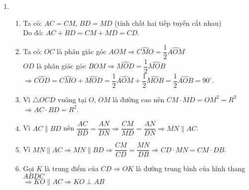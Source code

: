\begin{bt}
{\begin{center}
		\end{center}
		\begin{enumerate}[1.]
			\item 
			\begin{enumerate}
				\item  Ta có: $AC=CM$, $BD=MD$ (tính chất hai tiếp tuyến cắt nhau)\\ 
				Do đó: $AC+BD=CM+MD=CD$.
				\item Ta có: $OC$ là phân giác góc $AOM \Rightarrow \widehat{CMO}=\dfrac{1}{2}\widehat{AOM}$\\
				$OD$ là phân giác góc $BOM \Rightarrow \widehat{MOD}=\dfrac{1}{2}\widehat{MOB}$\\
				$\Rightarrow \widehat{COD}=\widehat{CMO}+\widehat{MOD}=\dfrac{1}{2}\widehat{AOM}+\dfrac{1}{2}\widehat{MOB}=\dfrac{1}{2}\widehat{AOB}=90^\circ$.
				\item Vì $\triangle OCD$ vuông tại $O$, $OM$ là đường cao nên $CM \cdot MD=OM^2=R^2$
				$\Rightarrow AC \cdot BD=R^2$.
				\item Vì $AC  \parallel BD$ nên $\dfrac{AC}{BD}=\dfrac{AN}{DN} \Rightarrow \dfrac{CM}{MD}=\dfrac{AN}{DN} \Rightarrow MN \parallel AC$.
				\item Vì $MN \parallel AC \Rightarrow MN \parallel BD \Rightarrow \dfrac{CM}{CD}=\dfrac{MN}{DB} \Rightarrow CD \cdot MN=CM \cdot DB$.
				\item Gọi $K$ là trung điểm của $CD \Rightarrow OK$ là đường trung bình của hình thang $ABDC$\\
				$ \Rightarrow KO \parallel AC \Rightarrow KO \perp AB$\\

\end{enumerate}
\end{enumerate}}
\end{bt}
